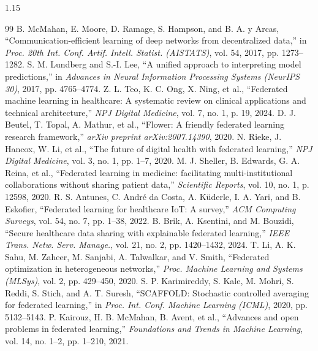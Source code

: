 \documentclass[12pt,a4paper,oneside]{report}
\begin{document}
\begin{spacing}{1.15}
\begin{thebibliography}{99}
     B. McMahan, E. Moore, D. Ramage, S. Hampson, and B. A. y Arcas, ``Communication-efficient learning of deep networks from decentralized data,'' in \textit{Proc. 20th Int. Conf. Artif. Intell. Statist. (AISTATS)}, vol. 54, 2017, pp. 1273--1282.
     S. M. Lundberg and S.-I. Lee, ``A unified approach to interpreting model predictions,'' in \textit{Advances in Neural Information Processing Systems (NeurIPS 30)}, 2017, pp. 4765--4774.
     Z. L. Teo, K. C. Ong, X. Ning, et al., ``Federated machine learning in healthcare: A systematic review on clinical applications and technical architecture,'' \textit{NPJ Digital Medicine}, vol. 7, no. 1, p. 19, 2024.
     D. J. Beutel, T. Topal, A. Mathur, et al., ``Flower: A friendly federated learning research framework,'' \textit{arXiv preprint arXiv:2007.14390}, 2020.
     N. Rieke, J. Hancox, W. Li, et al., ``The future of digital health with federated learning,'' \textit{NPJ Digital Medicine}, vol. 3, no. 1, pp. 1--7, 2020.
     M. J. Sheller, B. Edwards, G. A. Reina, et al., ``Federated learning in medicine: facilitating multi-institutional collaborations without sharing patient data,'' \textit{Scientific Reports}, vol. 10, no. 1, p. 12598, 2020.
     R. S. Antunes, C. André da Costa, A. Küderle, I. A. Yari, and B. Eskofier, ``Federated learning for healthcare IoT: A survey,'' \textit{ACM Computing Surveys}, vol. 54, no. 7, pp. 1--38, 2022.
     B. Brik, A. Ksentini, and M. Bouzidi, ``Secure healthcare data sharing with explainable federated learning,'' \textit{IEEE Trans. Netw. Serv. Manage.}, vol. 21, no. 2, pp. 1420--1432, 2024.
     T. Li, A. K. Sahu, M. Zaheer, M. Sanjabi, A. Talwalkar, and V. Smith, ``Federated optimization in heterogeneous networks,'' \textit{Proc. Machine Learning and Systems (MLSys)}, vol. 2, pp. 429--450, 2020.
     S. P. Karimireddy, S. Kale, M. Mohri, S. Reddi, S. Stich, and A. T. Suresh, ``SCAFFOLD: Stochastic controlled averaging for federated learning,'' in \textit{Proc. Int. Conf. Machine Learning (ICML)}, 2020, pp. 5132--5143.
     P. Kairouz, H. B. McMahan, B. Avent, et al., ``Advances and open problems in federated learning,'' \textit{Foundations and Trends in Machine Learning}, vol. 14, no. 1--2, pp. 1--210, 2021.

\end{thebibliography}
\end{spacing}
\end{document}
